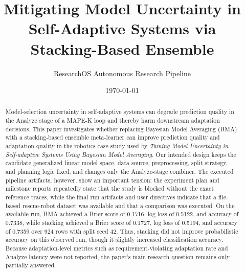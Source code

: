 \documentclass[11pt,a4paper]{article}
\title{Mitigating Model Uncertainty in Self-Adaptive Systems via Stacking-Based Ensemble}
\author{ResearchOS Autonomous Research Pipeline}
\date{\today}
\begin{document}
\maketitle

\begin{abstract}
Model-selection uncertainty in self-adaptive systems can degrade prediction quality in the Analyze stage of a MAPE-K loop and thereby harm downstream adaptation decisions. This paper investigates whether replacing Bayesian Model Averaging (BMA) with a stacking-based ensemble meta-learner can improve prediction quality and adaptation quality in the robotics case study used by \textit{Taming Model Uncertainty in Self-adaptive Systems Using Bayesian Model Averaging}. Our intended design keeps the candidate generalized linear model space, data source, preprocessing, split strategy, and planning logic fixed, and changes only the Analyze-stage combiner. The executed pipeline artifacts, however, show an important tension: the experiment plan and milestone reports repeatedly state that the study is blocked without the exact reference traces, while the final run artifacts and user directives indicate that a file-based rescue-robot dataset was available and that a comparison was executed. On the available run, BMA achieved a Brier score of 0.1716, log loss of 0.5122, and accuracy of 0.7338, while stacking achieved a Brier score of 0.1727, log loss of 0.5194, and accuracy of 0.7359 over 924 rows with split seed 42. Thus, stacking did not improve probabilistic accuracy on this observed run, though it slightly increased classification accuracy. Because adaptation-level metrics such as requirement-violating adaptation rate and Analyze latency were not reported, the paper’s main research question remains only partially answered.
\end{abstract}
\end{document}

